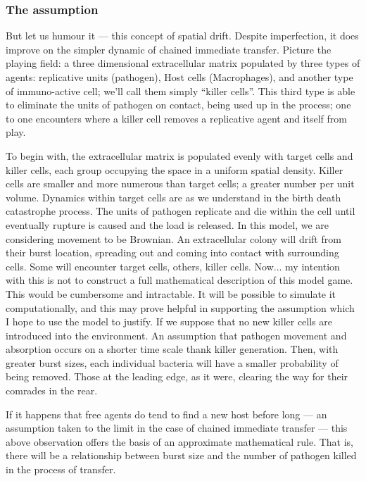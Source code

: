 \subsubsection{The assumption}
But let us humour it --- this concept of spatial drift. Despite imperfection, it does improve on the simpler dynamic of chained immediate transfer. Picture the playing field: a three dimensional extracellular matrix populated by three types of agents: replicative units (pathogen), Host cells (Macrophages), and another type of immuno-active cell; we'll call them simply ``killer cells''. This third type is able to eliminate the units of pathogen on contact, being used up in the process; one to one encounters where a killer cell removes a replicative agent and itself from play.\par
To begin with, the extracellular matrix is populated evenly with target cells and killer cells, each group occupying the space in a uniform spatial density. Killer cells are smaller and more numerous than target cells; a greater number per unit volume. Dynamics within target cells are as we understand in the birth death catastrophe process. The units of pathogen replicate and die within the cell until eventually rupture is caused and the load is released.
In this model, we are considering movement to be Brownian. An extracellular colony will drift from their burst location, spreading out and coming into contact with surrounding cells. Some will encounter target cells, others, killer cells. Now... my intention with this is not to construct a full mathematical description of this model game. This would be cumbersome and intractable. It will be possible to simulate it computationally, and this may prove helpful in supporting the assumption which I hope to use the model to justify. If we suppose that no new killer cells are introduced into the environment. An assumption that pathogen movement and absorption occurs on a shorter time scale thank killer generation. Then, with greater burst sizes, each individual bacteria will have a smaller probability of being removed. Those at the leading edge, as it were, clearing the way for their comrades in the rear.

If it happens that free agents do tend to find a new host before long --- an assumption taken to the limit in the case of chained immediate transfer --- this above observation offers the basis of an approximate mathematical rule. That is, there will be a relationship between burst size and the number of pathogen killed in the process of transfer. 

